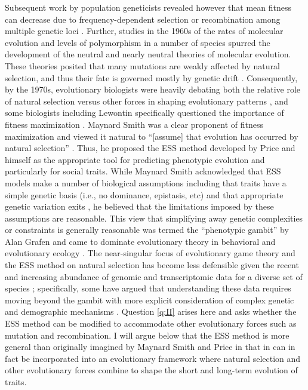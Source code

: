 \documentclass[11pt]{article}
\begin{document}
Subsequent work by population geneticists revealed however that mean fitness can decrease due to frequency-dependent selection \cite{Wright:1955,Lewontin:1970} or recombination among multiple genetic loci \cite{Kojima:Kelleher:1961,Moran:1964,Karlin:1975,Akin:1979}. Further, studies in the 1960s of the rates of molecular evolution \cite{Zuckerkandl:Pauling:1965,King:Jukes:1969} and levels of polymorphism \cite{Harris:1966,Lewontin:Hubby:1966} in a number of species spurred the development of the neutral \cite{Kimura:1968,Kimura:1983:book} and nearly neutral \cite{Ohta:1974,Ohta:1992} theories \cite{Ohta:Gillespie:1996} of molecular evolution. These theories posited that many mutations are weakly affected by natural selection, and thus their fate is governed mostly by genetic drift \cite{Kimura:1983:book}. Consequently, by the 1970s, evolutionary biologists were heavily debating both the relative role of natural selection versus other forces in shaping evolutionary patterns \cite{Gillespie:Langley:1974,Gillespie:1978}, and some biologists including Lewontin specifically questioned the importance of fitness maximization \cite{Karlin:1975,Gould:Lewontin:1979}. Maynard Smith was a clear proponent of fitness maximization and viewed it natural to ``[assume] that evolution has occurred by natural selection'' \cite[p. 31]{MaynardSmith:1978}. Thus, he proposed the ESS method developed by Price and himself as the appropriate tool for predicting phenotypic evolution and particularly for social traits. While Maynard Smith acknowledged that ESS models make a number of biological assumptions including that traits have a simple genetic basis (i.e., no dominance, epistasis, etc) and that appropriate genetic variation exits \cite{MaynardSmith:1978}, he believed that the limitations imposed by these assumptions are reasonable. This view that simplifying away genetic complexities or constraints is generally reasonable was termed the ``phenotypic gambit'' by Alan Grafen \cite{Grafen:1984} and came to dominate evolutionary theory in behavioral and evolutionary ecology \cite{Houston:McNamara:1999}. The near-singular focus of evolutionary game theory and the ESS method on natural selection has become less defensible given the recent and increasing abundance of genomic and transcriptomic data for a diverse set of species \cite[e.g.,][]{Kapheim:Pan:2015,Mikheyev:Linksvayer:2015,Warner:Mikheyev:2017,Kocher:Mallarino:2018,Warner:Mikheyev:2019}; specifically, some have argued that understanding these data requires moving beyond the gambit with more explicit consideration of complex genetic and demographic mechanisms \cite[e.g.,][]{Springer:Crespi:2011,Rittschof:Robinson:2014,Akcay:Linksvayer:2015,Cunningham:2020}. Question \ref{q:II} arises here and asks whether the ESS method can be modified to accommodate other evolutionary forces such as mutation and recombination. I will argue below that the ESS method is more general than originally imagined by Maynard Smith and Price \cite{Maynard-Smith:Price:1973} in that in can in fact be incorporated into an evolutionary framework where natural selection and other evolutionary forces combine to shape the short and long-term evolution of traits.
\end{document}
